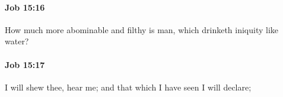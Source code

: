 		\paragraph{Job 15:16} %
			\label{JOB-15-16}

			How much more abominable and filthy is man, which drinketh iniquity like water?


		\paragraph{Job 15:17} %
			\label{JOB-15-17}

			I will shew thee, hear me; and that which I have seen I will declare;


